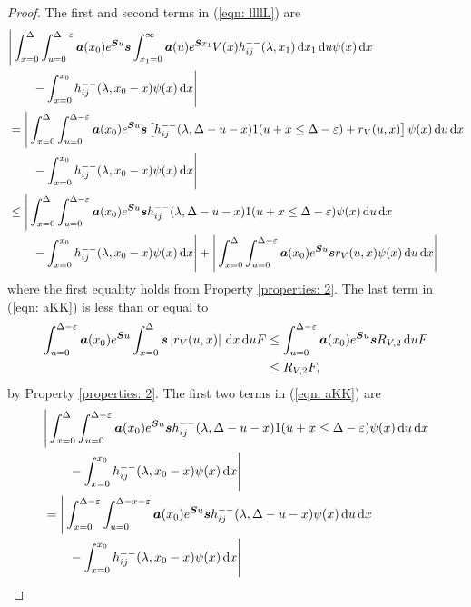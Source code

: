 \begin{proof}
	The first and second terms in (\ref{eqn: llllL}) are
	\begin{align}
		&\Bigg|\int_{x=0}^{\Delta}\int_{u=0}^{\Delta-\varepsilon} \boldsymbol a (x_0)e^{\boldsymbol Su}\boldsymbol s \int_{x_1=0}^\infty \boldsymbol a(u)  e^{\boldsymbol S x_1} V(x) h_{ij}^{--}(\lambda, x_1) \, \mathrm{d} x_1 \, \mathrm{d} u \psi(x) \, \mathrm{d} x \nonumber
		\\&{}\qquad {} - \int_{x=0}^{x_0} h_{ij}^{--}(\lambda, x_0 - x)\psi(x)\, \mathrm{d} x\Bigg| \nonumber
		\\&=\Bigg|\int_{x=0}^{\Delta}\int_{u=0}^{\Delta-\varepsilon} \boldsymbol a (x_0)e^{\boldsymbol Su}\boldsymbol s \left[ h_{ij}^{--}(\lambda, \Delta - u - x)1(u+x\leq \Delta-\varepsilon) + r_V(u,x) \right] \psi(x) \, \mathrm{d} u \, \mathrm{d} x \nonumber
		\\&{}\qquad {} - \int_{x=0}^{x_0} h_{ij}^{--}(\lambda, x_0 - x)\psi(x)\, \mathrm{d} x \Bigg|\nonumber
		\\&\leq \Bigg|\int_{x=0}^{\Delta}\int_{u=0}^{\Delta-\varepsilon} \boldsymbol a (x_0)e^{\boldsymbol Su}\boldsymbol s h_{ij}^{--}(\lambda, \Delta - u - x)1(u+x\leq \Delta-\varepsilon) \psi(x) \, \mathrm{d} u \, \mathrm{d} x \nonumber 
		\\&\qquad{} - \int_{x=0}^{x_0} h_{ij}^{--}(\lambda, x_0 - x)\psi(x)\, \mathrm{d} x \Bigg| + \Bigg| \int_{x=0}^{\Delta}\int_{u=0}^{\Delta-\varepsilon} \boldsymbol a (x_0)e^{\boldsymbol Su}\boldsymbol s r_V(u,x) \psi(x) \, \mathrm{d} u \, \mathrm{d} x \Bigg|
		\label{eqn: aKK}
	\end{align}
	where the first equality holds from Property \ref{properties: 2}. The last term in (\ref{eqn: aKK}) is less than or equal to 
	\begin{align}
		\int_{u=0}^{\Delta-\varepsilon} \boldsymbol a (x_0)e^{\boldsymbol Su} \int_{x=0}^{\Delta} \boldsymbol s \left|r_V(u,x)\right|\, \mathrm{d} x \, \mathrm{d} u F 
		&\leq \int_{u=0}^{\Delta-\varepsilon} \boldsymbol a (x_0)e^{\boldsymbol Su} \boldsymbol sR_{V,2} \, \mathrm{d} u F \nonumber 
		\\&\leq R_{V,2} F, \label{eqn: HhHj}
	\end{align}
	by Property \ref{properties: 2}. The first two terms in (\ref{eqn: aKK}) are 
	\begin{align}
		& \Bigg|\int_{x=0}^{\Delta}\int_{u=0}^{\Delta-\varepsilon} \bs a (x_0)e^{\bs Su}\bs s h_{ij}^{--}(\lambda, \Delta - u - x)1(u+x\leq \Delta-\varepsilon) \psi(x) \wrt u \wrt x \nonumber
		\\&\qquad{} - \int_{x=0}^{x_0} h_{ij}^{--}(\lambda, x_0 - x)\psi(x)\wrt x \Bigg| \nonumber 
		\\&= \Bigg|\int_{x=0}^{\Delta-\varepsilon}\int_{u=0}^{\Delta-x-\varepsilon} \bs a (x_0)e^{\bs Su}\bs s h_{ij}^{--}(\lambda, \Delta - u - x) \psi(x) \wrt u \wrt x \nonumber
		  \\&\qquad{}- \int_{x=0}^{x_0} h_{ij}^{--}(\lambda, x_0 - x)\psi(x)\wrt x \Bigg| \nonumber 

\end{align}
\end{proof}
